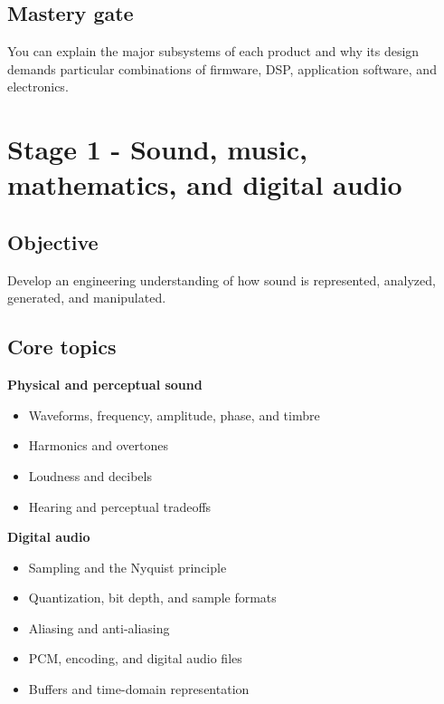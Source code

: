\documentclass[11pt,letterpaper]{article}
\begin{document}
\subsection*{Mastery gate}\label{mastery-gate}

You can explain the major subsystems of each product and why its design demands particular combinations of firmware, DSP, application software, and electronics.

\clearpage

\section{Stage 1 - Sound, music, mathematics, and digital audio}\label{stage-1-sound-music-mathematics-and-digital-audio}

\subsection*{Objective}\label{objective-1}

Develop an engineering understanding of how sound is represented, analyzed, generated, and manipulated.

\subsection*{Core topics}\label{core-topics}

\textbf{Physical and perceptual sound}

\begin{itemize}
\item Waveforms, frequency, amplitude, phase, and timbre
\item Harmonics and overtones
\item Loudness and decibels
\item Hearing and perceptual tradeoffs
\end{itemize}

\textbf{Digital audio}

\begin{itemize}
\item Sampling and the Nyquist principle
\item Quantization, bit depth, and sample formats
\item Aliasing and anti-aliasing
\item PCM, encoding, and digital audio files
\item Buffers and time-domain representation
\end{itemize}
\end{document}
